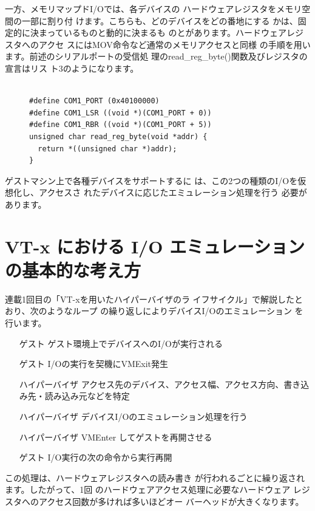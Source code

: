  一方、メモリマップドI/Oでは、各デバイスの
ハードウェアレジスタをメモリ空間の一部に割り付
けます。こちらも、どのデバイスをどの番地にする
かは、固定的に決まっているものと動的に決まるも
のとがあります。ハードウェアレジスタへのアクセ
スにはMOV命令など通常のメモリアクセスと同様
の手順を用います。前述のシリアルポートの受信処
理のread\_reg\_byte()関数及びレジスタの宣言はリス
ト3のようになります。

\begin{figure}\centering
\begin{verbatim}

#define COM1_PORT (0x40100000)
#define COM1_LSR ((void *)(COM1_PORT + 0))
#define COM1_RBR ((void *)(COM1_PORT + 5))
unsigned char read_reg_byte(void *addr) {
  return *((unsigned char *)addr);
}
\end{verbatim}
\end{figure}

 ゲストマシン上で各種デバイスをサポートするに
は、この2つの種類のI/Oを仮想化し、アクセスさ
れたデバイスに応じたエミュレーション処理を行う
必要があります。


\section{VT-x における I/O エミュレーションの基本的な考え方}

 連載1回目の「VT-xを用いたハイパーバイザのラ
イフサイクル」で解説したとおり、次のようなループ
の繰り返しによりデバイスI/Oのエミュレーション
を行います。

\begin{enumerate}
\item[ゲスト]ゲスト環境上でデバイスへのI/Oが実行される
\item[ゲスト]I/Oの実行を契機にVMExit発生
\item[ハイパーバイザ]アクセス先のデバイス、アクセス幅、アクセス方向、書き込み先・読み込み元などを特定
\item[ハイパーバイザ]デバイスI/Oのエミュレーション処理を行う
\item[ハイパーバイザ]VMEnter してゲストを再開させる
\item[ゲスト]I/O実行の次の命令から実行再開
\end{enumerate}

 この処理は、ハードウェアレジスタへの読み書き
が行われるごとに繰り返されます。したがって、1回
のハードウェアアクセス処理に必要なハードウェア
レジスタへのアクセス回数が多ければ多いほどオー
バーヘッドが大きくなります。


